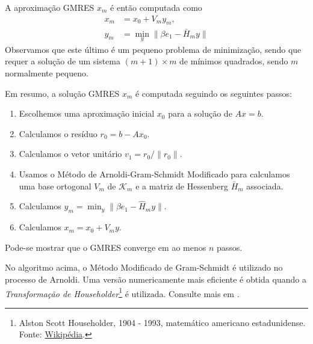 A aproximação GMRES $x_m$ é então computada como
\begin{align}
  x_m &= x_0 + V_my_m,\\
  y_m &= \min_{y} \|\beta e_1 - \bar{H}_my\|
\end{align}
Observamos que este último é um pequeno problema de minimização, sendo que requer a solução de um sistema $(m+1)\times m$ de mínimos quadrados, sendo $m$ normalmente pequeno.


Em resumo, a solução GMRES $x_m$ é computada seguindo os seguintes passos:
\begin{enumerate}[1.]
\item Escolhemos uma aproximação inicial $x_0$ para a solução de $Ax = b$.
\item Calculamos o resíduo $r_0 = b - Ax_0$.
\item Calculamos o vetor unitário $v_1 = r_0/\|r_0\|$.
\item Usamos o Método de Arnoldi-Gram-Schmidt Modificado para calculamos uma base ortogonal $V_m$ de $\mathcal{K}_m$ e a matriz de Hessenberg $\bar{H}_m$ associada.
\item Calculamos $y_m = \min_{y} \|\beta e_1 - \hat{H}_my\|$.
\item Calculamos $x_m = x_0 + V_my$.
\end{enumerate}

\begin{obs}[Convergência]
  Pode-se mostrar que o GMRES converge em ao menos $n$ passos.
\end{obs}

\begin{obs}
  No algoritmo acima, o Método Modificado de Gram-Schmidt é utilizado no processo de Arnoldi. Uma versão numericamente mais eficiente é obtida quando a \emph{Transformação de Householder}\footnote{Alston Scott Householder, 1904 - 1993, matemático americano estadunidense. Fonte: \href{https://pt.wikipedia.org/wiki/Alston_Scott_Householder}{Wikipédia}.} é utilizada. Consulte mais em \cite[Subsetion 6.5.2]{Saad2003}.
\end{obs}

